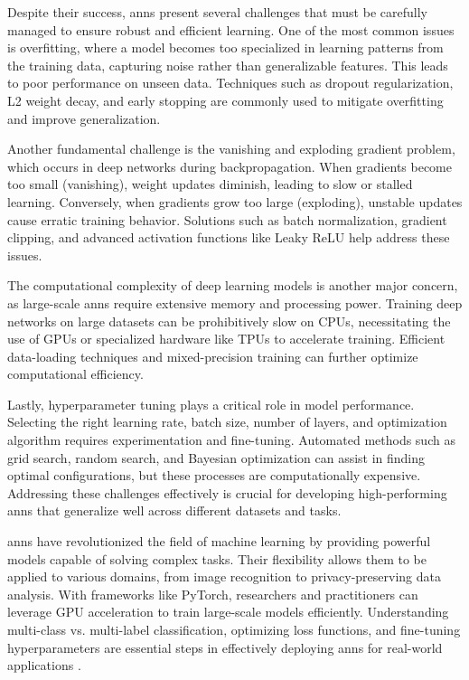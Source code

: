 Despite their success, \ac{ann}s present several challenges that must be carefully managed to ensure robust and efficient learning.
One of the most common issues is overfitting, where a model becomes too specialized in learning patterns from the training data, capturing noise rather than generalizable features.
This leads to poor performance on unseen data.
Techniques such as dropout regularization, L2 weight decay, and early stopping are commonly used to mitigate overfitting and improve generalization.

Another fundamental challenge is the vanishing and exploding gradient problem, which occurs in deep networks during backpropagation.
When gradients become too small (vanishing), weight updates diminish, leading to slow or stalled learning.
Conversely, when gradients grow too large (exploding), unstable updates cause erratic training behavior.
Solutions such as batch normalization, gradient clipping, and advanced activation functions like Leaky ReLU help address these issues.

The computational complexity of deep learning models is another major concern, as large-scale \ac{ann}s require extensive memory and processing power.
Training deep networks on large datasets can be prohibitively slow on CPUs, necessitating the use of GPUs or specialized hardware like TPUs to accelerate training.
Efficient data-loading techniques and mixed-precision training can further optimize computational efficiency.

Lastly, hyperparameter tuning plays a critical role in model performance.
Selecting the right learning rate, batch size, number of layers, and optimization algorithm requires experimentation and fine-tuning.
Automated methods such as grid search, random search, and Bayesian optimization can assist in finding optimal configurations, but these processes are computationally expensive.
Addressing these challenges effectively is crucial for developing high-performing \ac{ann}s that generalize well across different datasets and tasks.

\ac{ann}s have revolutionized the field of machine learning by providing powerful models capable of solving complex tasks.
Their flexibility allows them to be applied to various domains, from image recognition to privacy-preserving data analysis.
With frameworks like PyTorch, researchers and practitioners can leverage GPU acceleration to train large-scale models efficiently.
Understanding multi-class vs. multi-label classification, optimizing loss functions, and fine-tuning hyperparameters are essential steps in effectively deploying \ac{ann}s for real-world applications \cite{goodfellow2016deep}.
